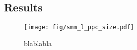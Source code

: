 \documentclass{bioinfo}
\begin{document}
\begin{application}
\section*{Results}



\begin{figure}[!tpb]
\centerline{\texttt{[image: fig/smm\_l\_ppc\_size.pdf]}}
\caption{blablabla}\label{fig:01}
\end{figure}





%
%
%
%
%






\end{application}
\end{document}
